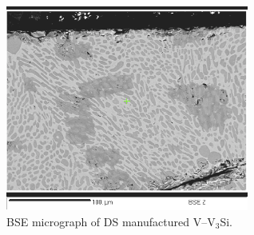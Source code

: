 \begin{figure}[htbp]
\begin{center}
\includegraphics[width=8cm]{_Jun19_09vv3si_long_50um_side_i_bse_scale}
\caption{BSE micrograph of DS manufactured V--V$_3$Si.}
\label{fig:VDSi}
\end{center}
\end{figure}


